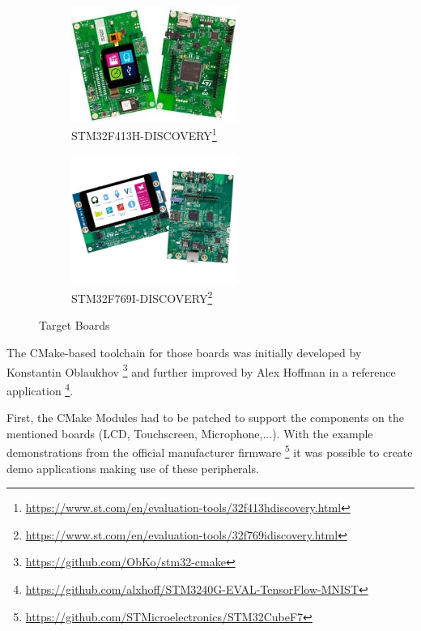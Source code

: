 \documentclass[oneside]{tum-book}
\begin{document}
\begin{figure}[h]
     \centering
     \begin{subfigure}[b]{0.4\textwidth}
         \centering
         \includegraphics[width=0.6\textwidth]{figures/disco_f413h.jpg}
         \caption{STM32F413H-DISCOVERY\footnote{\url{https://www.st.com/en/evaluation-tools/32f413hdiscovery.html}}}
         \label{fig:stm32f4}
     \end{subfigure}
     \hfill
     \begin{subfigure}[b]{0.4\textwidth}
         \centering
         \includegraphics[width=0.6\textwidth]{figures/disco_f769i.jpg}
         \caption{STM32F769I-DISCOVERY\footnote[2]{\url{https://www.st.com/en/evaluation-tools/32f769idiscovery.html}}}
         \label{fig:stm32f7}
     \end{subfigure}
        \caption{Target Boards}
        \label{fig:boards}
\end{figure}

The CMake-based toolchain for those boards was initially developed by Konstantin Oblaukhov \footnote{\url{https://github.com/ObKo/stm32-cmake}} and further improved by Alex Hoffman in a reference application \footnote{\url{https://github.com/alxhoff/STM3240G-EVAL-TensorFlow-MNIST}}.

First, the CMake Modules had to be patched to support the components on the mentioned boards (LCD, Touchscreen, Microphone,...). With the example demonstrations from the official manufacturer firmware \footnote{\url{https://github.com/STMicroelectronics/STM32CubeF7}} it was possible to create demo applications making use of these peripherals.
\end{document}
